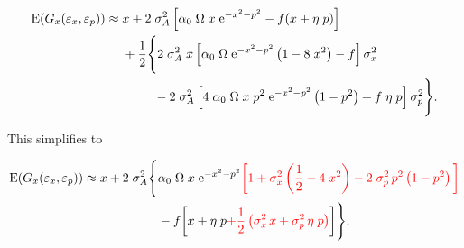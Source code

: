 \begin{equation*}
\begin{split}
    \text{E}(G_x(\varepsilon_{x}, \varepsilon_{p})) \approx \; &
        x + 2 \; \sigma_A^2 \left[ 
            \alpha_0 \; \Omega \; x \; \text{e}^{-x^2 - p^2} - f (x + \eta \; p)
        \right] \\
        &+ \frac{1}{2} \Bigg\{
            2 \; \sigma_A^2 \; x \left[
                \alpha_0 \; \Omega \; \text{e}^{-x^2 - p^2} \left( 1 - 8 \; x^2 \right) - f
            \right] \sigma^2_{x} \\
            & \hspace{2.5em} - 2 \; \sigma_A^2 \left[
                4 \; \alpha_0 \; \Omega \; x \; p^2 \; \text{e}^{-x^2 - p^2} \left( 1 - p^2 \right) + f \; \eta \; p
            \right] \sigma^2_{p}
        \Bigg\} %
%
%
%
%
\text{.}
\end{split}
\end{equation*}

This simplifies to 

\begin{equation}
\label{eq:taylor-expansion-final-supp}
\begin{split}
    \text{E}(G_x(\varepsilon_{x}, \varepsilon_{p})) \approx
        x + 2 \; \sigma_A^2 \Bigg\{ 
            & \alpha_0 \; \Omega \; x \; \text{e}^{-x^2 - p^2} 
            \color{red} \bigg[ 
                1 + \sigma^2_{x} \left( \frac{1}{2} - 4 \; x^2 \right)
                - 2 \; \sigma^2_{p} \, p^2 \left( 1 - p^2 \right)
            \bigg] \\
            & - f \bigg[
                x + \eta \; p 
                {\color{red} + \frac{1}{2} \left(
                    \sigma^2_{x} \, x + \sigma^2_{p} \, \eta \; p
                \right)}
            \bigg]
        \Bigg\}
\text{.}
\end{split}
\end{equation}


